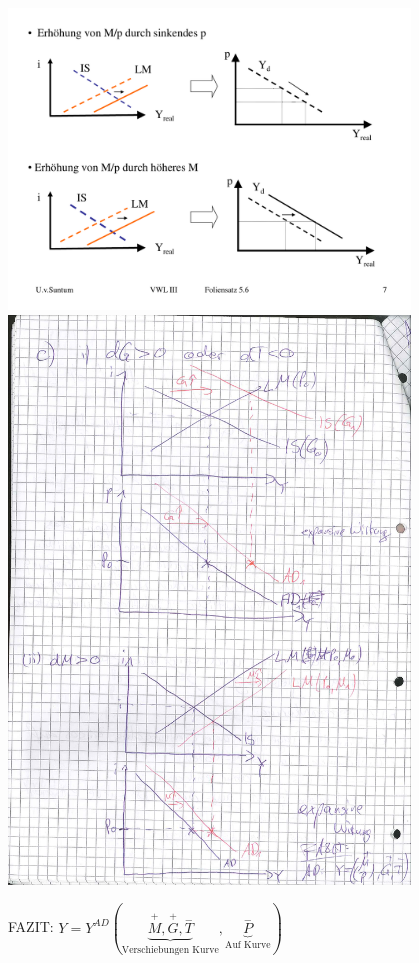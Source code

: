 \documentclass{scrartcl}
\begin{document}
\begin{enumerate}[a)]
\begin{enumerate}
        \includegraphics[width=0.8\textwidth]{Bilder/ADLage2.pdf}\\
        \includegraphics[width=0.8\textwidth]{Bilder/ADLage22.pdf}\\
  \end{enumerate}
  FAZIT: $Y=Y^{AD}(\underbrace{\overset{+}{M},\overset{+}{G},\overset{-}{T}}_\text{Verschiebungen Kurve},\underbrace{\overset{-}{P}}_\text{Auf Kurve})$
\end{enumerate}
\newpage
\end{document}
